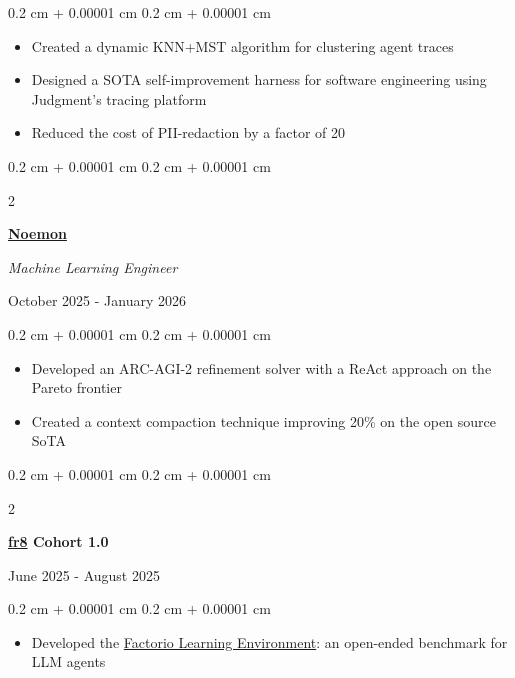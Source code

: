 \documentclass[10pt, letterpaper]{article}
\newenvironment{highlights}{
    \begin{itemize}[
        topsep=0.10 cm,
        parsep=0.10 cm,
        partopsep=0pt,
        itemsep=0pt,
        leftmargin=0.4 cm + 10pt
    ]
}{
    \end{itemize}
}
\newenvironment{onecolentry}{
    \begin{adjustwidth}{
        0.2 cm + 0.00001 cm
    }{
        0.2 cm + 0.00001 cm
    }
}{
    \end{adjustwidth}
}
\newenvironment{twocolentry}[2][]{
    \begin{adjustwidth}{
        0.2 cm + 0.00001 cm
    }{
        0.2 cm + 0.00001 cm
    }
    \def\secondColumn{#2}
    \setcolumnwidth{\fill, 4.5 cm}
    \begin{paracol}{2}
}{
    \switchcolumn \raggedleft \secondColumn
    \end{paracol}
    \end{adjustwidth}
}
\let\hrefWithoutArrow\href
\renewcommand{\href}[2]{\hrefWithoutArrow{#1}{#2}}
\begin{document}
        \vspace{0.09 cm}
        \begin{onecolentry}
            \begin{highlights}
                \item Created a dynamic KNN+MST algorithm for clustering agent traces
                \item Designed a SOTA self-improvement harness for software engineering using Judgment's tracing platform
                \item Reduced the cost of PII-redaction by a factor of 20
            \end{highlights}
        \end{onecolentry}

        \vspace{0.09 cm}

        \begin{twocolentry}{October 2025 - January 2026}
            \textbf{\href{https://www.noemon.com}{Noemon}}
            
            \textit{Machine Learning Engineer}

        \end{twocolentry}

        \vspace{0.09 cm}
        \begin{onecolentry}
            \begin{highlights}
                \item Developed an ARC-AGI-2 refinement solver with a ReAct approach on the Pareto frontier
                \item Created a context compaction technique improving 20\% on the open source SoTA
            \end{highlights}
        \end{onecolentry}

        \vspace{0.09 cm}
        
        \begin{twocolentry}{
            June 2025 - August 2025
        }
            \textbf{\href{https://fr8.so}{fr8} Cohort 1.0}

        \end{twocolentry}

        \vspace{0.09 cm}
        \begin{onecolentry}
            \begin{highlights}
                \item Developed the \href{https://github.com/JackHopkins/factorio-learning-environment/}{Factorio Learning Environment}: an open-ended benchmark for LLM agents
            \end{highlights}
        \end{onecolentry}
\end{document}
